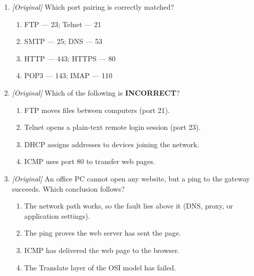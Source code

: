 \documentclass[11pt]{article}
\begin{document}
\begin{enumerate}[label=\textbf{Q\arabic*.}, leftmargin=*]
\begin{enumerate}[label=\Alph*.]
      Physical
    \item Physical, Data Link, Network, Transport, Session, Presentation,
      Application
    \item Physical, Network, Data Link, Session, Transport, Application,
      Presentation
    \item Data Link, Physical, Transport, Network, Application, Session,
      Presentation
  \end{enumerate}
\item \textit{[Original]} Which port pairing is correctly matched?
  \begin{enumerate}[label=\Alph*.]
    \item FTP --- 23; Telnet --- 21
    \item SMTP --- 25; DNS --- 53
    \item HTTP --- 443; HTTPS --- 80
    \item POP3 --- 143; IMAP --- 110
  \end{enumerate}
\item \textit{[Original]} Which of the following is \textbf{INCORRECT}?
  \begin{enumerate}[label=\Alph*.]
    \item FTP moves files between computers (port 21).
    \item Telnet opens a plain-text remote login session (port 23).
    \item DHCP assigns addresses to devices joining the network.
    \item ICMP uses port 80 to transfer web pages.
  \end{enumerate}
\item \textit{[Original]} An office PC cannot open any website, but a ping to
  the gateway succeeds. Which conclusion follows?
  \begin{enumerate}[label=\Alph*.]
    \item The network path works, so the fault lies above it (DNS, proxy,
      or application settings).
    \item The ping proves the web server has sent the page.
    \item ICMP has delivered the web page to the browser.
    \item The Translate layer of the OSI model has failed.
  \end{enumerate}


\end{enumerate}
\end{document}
